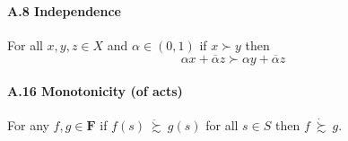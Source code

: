\documentclass[landscape, 12pt]{extarticle}
\newcommand{\dsuccsim}{\ \dot \succsim \ }
\newcommand{\ddsuccsim}{\ \ddot \succsim \ }
\begin{document}
\begin{multicols}{2}
	\paragraph{A.8 Independence}
	For all $x, y, z \in X$ and $\alpha \in (0,1)$
	if $x \succ y$ then
	\[
		\alpha x + \overline \alpha z \succ \alpha y + \overline \alpha z
	\]

	\paragraph{A.16 Monotonicity (of acts)}
	For any $f, g \in \bm F$ if $f(s) \ddsuccsim g(s)$ for all $s \in S$
	then $f \dsuccsim g$.



\end{multicols}
\end{document}
